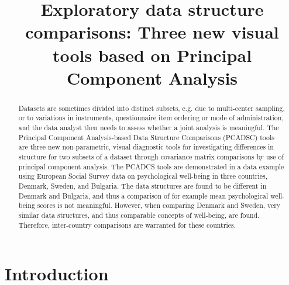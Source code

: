 \documentclass[a4paper,12pt]{article}
\begin{document}

\title{Exploratory data structure comparisons: Three new visual tools based on Principal Component Analysis}

\author[1]{}
\date{}
\maketitle



\renewcommand{\abstractname}{Abstract}
\renewcommand{\figurename}{Figure}
\renewcommand{\tablename}{Table}

\begin{abstract}
Datasets are sometimes divided into distinct subsets, e.g. due to multi-center sampling, or to variations in instruments, questionnaire item ordering or mode of administration, and the data analyst then needs to assess whether a joint analysis is meaningful. The Principal Component Analysis-based Data Structure Comparisons (PCADSC) tools are three new non-parametric, visual diagnostic tools for investigating differences in structure for two subsets of a dataset through covariance matrix comparisons by use of principal component analysis. The PCADCS tools are demonstrated in a data example using European Social Survey data on psychological well-being in three countries, Denmark, Sweden, and Bulgaria. The data structures are found to be different in Denmark and Bulgaria, and thus a comparison of for example mean psychological well-being scores is not meaningful. However, when comparing Denmark and Sweden, very similar data structures, and thus comparable concepts of well-being, are found. Therefore, inter-country comparisons are warranted for these countries.
\end{abstract}








\section*{Introduction}\label{sec:introduction}
\end{document}

